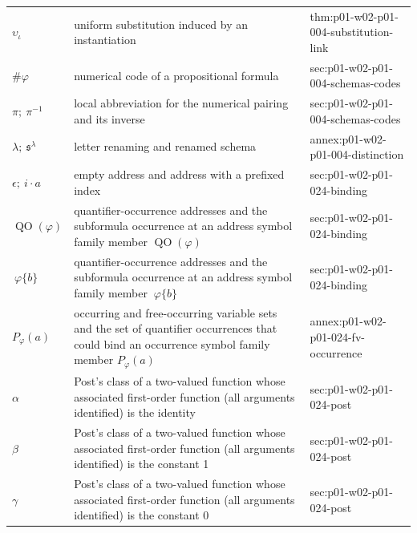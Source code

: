 \begin{longtable}{@{}p{}p{}p{}@{}}
\(\upsilon_\iota\) & uniform substitution induced by an instantiation & thm:\allowbreak{}p01-\allowbreak{}w02-\allowbreak{}p01-\allowbreak{}004-\allowbreak{}substitution-\allowbreak{}link \\
\(\#\varphi\) & numerical code of a propositional formula & sec:\allowbreak{}p01-\allowbreak{}w02-\allowbreak{}p01-\allowbreak{}004-\allowbreak{}schemas-\allowbreak{}codes \\
\(\pi;\allowbreak \ \pi^{-1}\) & local abbreviation for the numerical pairing and its inverse & sec:\allowbreak{}p01-\allowbreak{}w02-\allowbreak{}p01-\allowbreak{}004-\allowbreak{}schemas-\allowbreak{}codes \\
\(\lambda;\allowbreak \ \mathfrak s^{\lambda}\) & letter renaming and renamed schema & annex:\allowbreak{}p01-\allowbreak{}w02-\allowbreak{}p01-\allowbreak{}004-\allowbreak{}distinction \\
\(\epsilon;\allowbreak \ i\cdot a\) & empty address and address with a prefixed index & sec:\allowbreak{}p01-\allowbreak{}w02-\allowbreak{}p01-\allowbreak{}024-\allowbreak{}binding \\
\(\operatorname{QO}(\varphi)\) & quantifier-occurrence addresses and the subformula occurrence at an address symbol family member \(\operatorname{QO}(\varphi)\) & sec:\allowbreak{}p01-\allowbreak{}w02-\allowbreak{}p01-\allowbreak{}024-\allowbreak{}binding \\
\(\ \varphi\{b\}\) & quantifier-occurrence addresses and the subformula occurrence at an address symbol family member \(\ \varphi\{b\}\) & sec:\allowbreak{}p01-\allowbreak{}w02-\allowbreak{}p01-\allowbreak{}024-\allowbreak{}binding \\
\(P_\varphi(a)\) & occurring and free-occurring variable sets and the set of quantifier occurrences that could bind an occurrence symbol family member \(P_\varphi(a)\) & annex:\allowbreak{}p01-\allowbreak{}w02-\allowbreak{}p01-\allowbreak{}024-\allowbreak{}fv-\allowbreak{}occurrence \\
\(\alpha\) & Post's class of a two-valued function whose associated first-order function (all arguments identified) is the identity & sec:\allowbreak{}p01-\allowbreak{}w02-\allowbreak{}p01-\allowbreak{}024-\allowbreak{}post \\
\(\beta\) & Post's class of a two-valued function whose associated first-order function (all arguments identified) is the constant 1 & sec:\allowbreak{}p01-\allowbreak{}w02-\allowbreak{}p01-\allowbreak{}024-\allowbreak{}post \\
\(\gamma\) & Post's class of a two-valued function whose associated first-order function (all arguments identified) is the constant 0 & sec:\allowbreak{}p01-\allowbreak{}w02-\allowbreak{}p01-\allowbreak{}024-\allowbreak{}post \\

\end{longtable}
